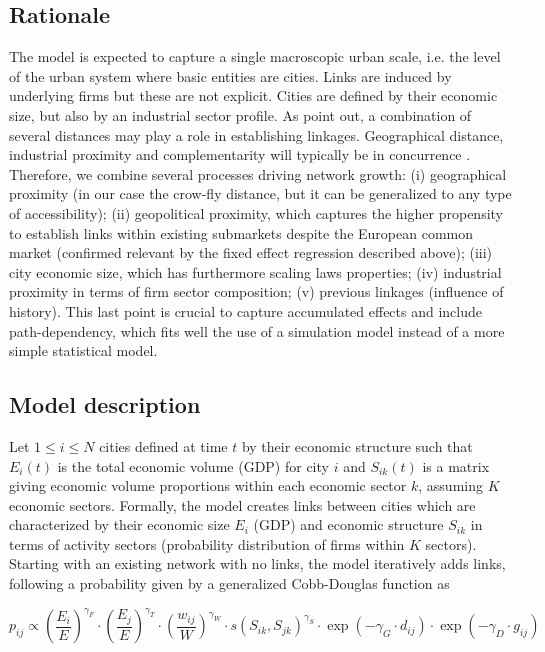 \documentclass[11pt]{article}
\begin{document}
\subsection{Rationale}

The model is expected to capture a single macroscopic urban scale, i.e. the level of the urban system where basic entities are cities. Links are induced by underlying firms but these are not explicit. Cities are defined by their economic size, but also by an industrial sector profile. As \citep{martinus2018global} point out, a combination of several distances may play a role in establishing linkages. Geographical distance, industrial proximity and complementarity will typically be in concurrence \cite{cottineau2020nested}. Therefore, we combine several processes driving network growth: (i) geographical proximity (in our case the crow-fly distance, but it can be generalized to any type of accessibility); (ii) geopolitical proximity, which captures the higher propensity to establish links within existing submarkets despite the European common market (confirmed relevant by the fixed effect regression described above); (iii) city economic size, which has furthermore scaling laws properties; (iv) industrial proximity in terms of firm sector composition; (v) previous linkages (influence of history). This last point is crucial to capture accumulated effects and include path-dependency, which fits well the use of a simulation model instead of a more simple statistical model.



\subsection{Model description}

Let $1 \leq i \leq N$ cities defined at time $t$ by their economic structure such that $E_i(t)$ is the total economic volume (GDP) for city $i$ and $S_{ik}(t)$ is a matrix giving economic volume proportions within each economic sector $k$, assuming $K$ economic sectors. Formally, the model creates links between cities which are characterized by their economic size $E_i$ (GDP) and economic structure $S_{ik}$ in terms of activity sectors (probability distribution of firms within $K$ sectors). Starting with an existing network with no links, the model iteratively adds links, following a probability given by a generalized Cobb-Douglas function \cite{vilcu2011geometric} as 

\begin{equation}
p_{ij} \propto \left(\frac{E_{i}}{E}\right)^{\gamma_F} \cdot \left(\frac{E_{j}}{E}\right)^{\gamma_T} \cdot \left(\frac{w_{ij}}{W}\right)^{\gamma_W} \cdot s\left(S_{ik},S_{jk}\right)^{\gamma_S} \cdot \exp \left(- \gamma_G \cdot d_{ij}\right) \cdot \exp \left(- \gamma_D \cdot g_{ij}\right)
\end{equation}
\end{document}
